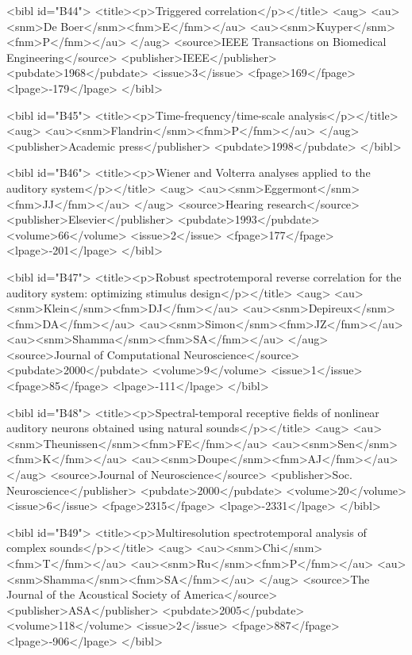 \documentclass{bmcart}
\begin{document}
\begin{backmatter}
{<bibl id="B44">
  <title><p>Triggered correlation</p></title>
  <aug>
    <au><snm>De Boer</snm><fnm>E</fnm></au>
    <au><snm>Kuyper</snm><fnm>P</fnm></au>
  </aug>
  <source>IEEE Transactions on Biomedical Engineering</source>
  <publisher>IEEE</publisher>
  <pubdate>1968</pubdate>
  <issue>3</issue>
  <fpage>169</fpage>
  <lpage>-179</lpage>
</bibl>

<bibl id="B45">
  <title><p>Time-frequency/time-scale analysis</p></title>
  <aug>
    <au><snm>Flandrin</snm><fnm>P</fnm></au>
  </aug>
  <publisher>Academic press</publisher>
  <pubdate>1998</pubdate>
</bibl>

<bibl id="B46">
  <title><p>Wiener and Volterra analyses applied to the auditory
  system</p></title>
  <aug>
    <au><snm>Eggermont</snm><fnm>JJ</fnm></au>
  </aug>
  <source>Hearing research</source>
  <publisher>Elsevier</publisher>
  <pubdate>1993</pubdate>
  <volume>66</volume>
  <issue>2</issue>
  <fpage>177</fpage>
  <lpage>-201</lpage>
</bibl>

<bibl id="B47">
  <title><p>Robust spectrotemporal reverse correlation for the auditory system:
  optimizing stimulus design</p></title>
  <aug>
    <au><snm>Klein</snm><fnm>DJ</fnm></au>
    <au><snm>Depireux</snm><fnm>DA</fnm></au>
    <au><snm>Simon</snm><fnm>JZ</fnm></au>
    <au><snm>Shamma</snm><fnm>SA</fnm></au>
  </aug>
  <source>Journal of Computational Neuroscience</source>
  <pubdate>2000</pubdate>
  <volume>9</volume>
  <issue>1</issue>
  <fpage>85</fpage>
  <lpage>-111</lpage>
</bibl>

<bibl id="B48">
  <title><p>Spectral-temporal receptive fields of nonlinear auditory neurons
  obtained using natural sounds</p></title>
  <aug>
    <au><snm>Theunissen</snm><fnm>FE</fnm></au>
    <au><snm>Sen</snm><fnm>K</fnm></au>
    <au><snm>Doupe</snm><fnm>AJ</fnm></au>
  </aug>
  <source>Journal of Neuroscience</source>
  <publisher>Soc. Neuroscience</publisher>
  <pubdate>2000</pubdate>
  <volume>20</volume>
  <issue>6</issue>
  <fpage>2315</fpage>
  <lpage>-2331</lpage>
</bibl>

<bibl id="B49">
  <title><p>Multiresolution spectrotemporal analysis of complex
  sounds</p></title>
  <aug>
    <au><snm>Chi</snm><fnm>T</fnm></au>
    <au><snm>Ru</snm><fnm>P</fnm></au>
    <au><snm>Shamma</snm><fnm>SA</fnm></au>
  </aug>
  <source>The Journal of the Acoustical Society of America</source>
  <publisher>ASA</publisher>
  <pubdate>2005</pubdate>
  <volume>118</volume>
  <issue>2</issue>
  <fpage>887</fpage>
  <lpage>-906</lpage>
</bibl>

}
\end{backmatter}
\end{document}
